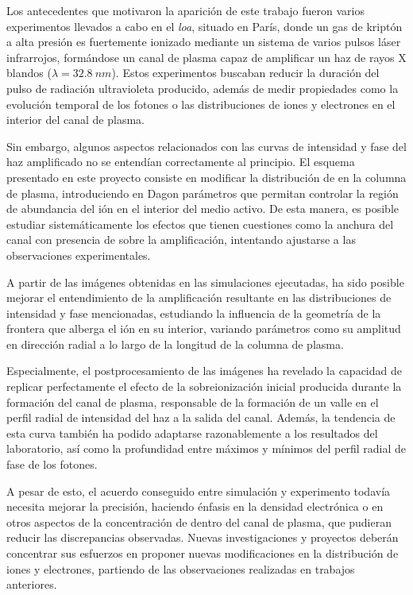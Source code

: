 Los antecedentes que motivaron la aparición de este trabajo fueron varios experimentos\autocite{Tuitje2020,Depresseux2015} llevados a cabo en el \emph{\acrfull{loa}}, situado en París, donde un gas de kriptón a alta presión es fuertemente ionizado mediante un sistema de varios pulsos láser infrarrojos, formándose un canal de plasma capaz de amplificar un haz de rayos X blandos ($\lambda=\qty{32.8}{nm}$). Estos experimentos buscaban reducir la duración del pulso de radiación ultravioleta producido, además de medir propiedades como la evolución temporal de los fotones o las distribuciones de iones y electrones en el interior del canal de plasma. 

Sin embargo, algunos aspectos relacionados con las curvas de intensidad y fase del haz amplificado no se entendían correctamente al principio. El esquema presentado en este proyecto consiste en modificar la distribución de  en la columna de plasma, introduciendo en Dagon parámetros que permitan controlar la región de abundancia del ión en el interior del medio activo. De esta manera, es posible estudiar sistemáticamente los efectos que tienen cuestiones como la anchura del canal con presencia de  sobre la amplificación, intentando ajustarse a las observaciones experimentales.

A partir de las imágenes obtenidas en las simulaciones ejecutadas, ha sido posible mejorar el entendimiento de la amplificación resultante en las distribuciones de intensidad y fase mencionadas, estudiando la influencia de la geometría de la frontera que alberga el ión  en su interior, variando parámetros como su amplitud en dirección radial a lo largo de la longitud de la columna de plasma.

Especialmente, el postprocesamiento de las imágenes ha revelado la capacidad de replicar perfectamente el efecto de la sobreionización inicial producida durante la formación del canal de plasma, responsable de la formación de un valle en el perfil radial de intensidad del haz a la salida del canal. Además, la tendencia de esta curva también ha podido adaptarse razonablemente a los resultados del laboratorio, así como la profundidad entre máximos y mínimos del perfil radial de fase de los fotones.

A pesar de esto, el acuerdo conseguido entre simulación y experimento todavía necesita mejorar la precisión, haciendo énfasis en la densidad electrónica o en otros aspectos de la concentración de  dentro del canal de plasma, que pudieran reducir las discrepancias observadas. Nuevas investigaciones y proyectos deberán concentrar sus esfuerzos en proponer nuevas modificaciones en la distribución de iones y electrones, partiendo de las observaciones realizadas en trabajos anteriores.

